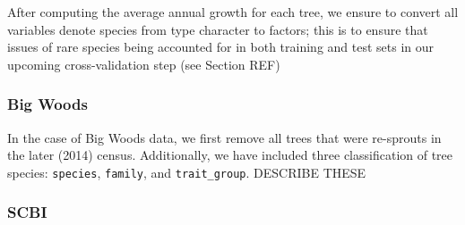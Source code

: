 \documentclass[12pt]{article}
\newenvironment{Shaded}{\begin{snugshade}}{\end{snugshade}}
\newcommand{\CommentTok}[1]{\textcolor[rgb]{0.56,0.35,0.01}{\textit{#1}}}
\newcommand{\DataTypeTok}[1]{\textcolor[rgb]{0.13,0.29,0.53}{#1}}
\newcommand{\DecValTok}[1]{\textcolor[rgb]{0.00,0.00,0.81}{#1}}
\newcommand{\KeywordTok}[1]{\textcolor[rgb]{0.13,0.29,0.53}{\textbf{#1}}}
\newcommand{\NormalTok}[1]{#1}
\newcommand{\OperatorTok}[1]{\textcolor[rgb]{0.81,0.36,0.00}{\textbf{#1}}}
\newcommand{\StringTok}[1]{\textcolor[rgb]{0.31,0.60,0.02}{#1}}
\begin{document}
After computing the average annual growth for each tree, we ensure to
convert all variables denote species from type character to factors;
this is to ensure that issues of rare species being accounted for in
both training and test sets in our upcoming cross-validation step (see
Section REF)

\hypertarget{big-woods-1}{%
\subsubsection{Big Woods}\label{big-woods-1}}

In the case of Big Woods data, we first remove all trees that were
re-sprouts in the later (2014) census. Additionally, we have included
three classification of tree species: \texttt{species}, \texttt{family},
and \texttt{trait\_group}. DESCRIBE THESE

\begin{Shaded}
\end{Shaded}

\hypertarget{scbi}{%
\subsubsection{SCBI}\label{scbi}}
\end{document}

